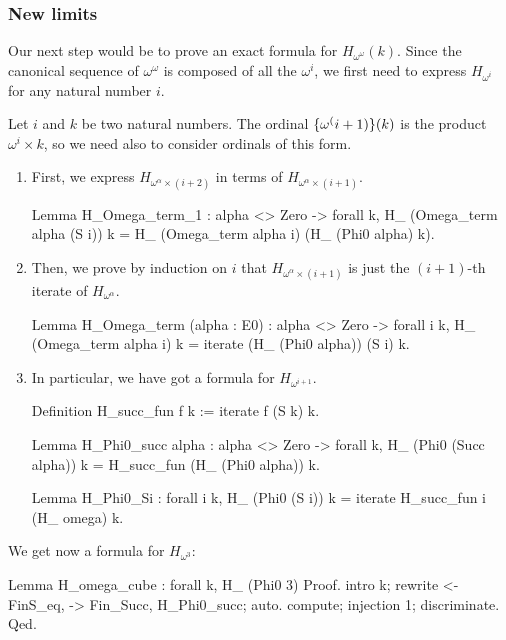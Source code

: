 \documentclass[a4paper]{book}
\begin{document}
\subsubsection{New limits}

Our next step would be to prove an exact formula for $H_{\omega^\omega}(k)$.
Since the canonical sequence of $\omega^\omega$ is composed of all the
$\omega^i$, we first need to express $H_{\omega^i}$ for any natural number $i$.

Let $i$ and $k$ be two natural numbers. 
The ordinal $\mbox{$\{\omega^(i+1)\}(k)$}$ is the product
$\omega^i \times k$, so we need also to consider ordinals of this form.

\begin{enumerate}
\item First,  we express $H_{\omega^\alpha \times (i+2)}$ in terms of
$H_{\omega^\alpha \times (i+1)}$.

\begin{Coqsrc}
Lemma H_Omega_term_1 : alpha <> Zero -> forall  k,  
    H_ (Omega_term alpha (S i)) k =
    H_ (Omega_term alpha i) (H_ (Phi0 alpha) k).
\end{Coqsrc}

\item
Then, we prove by induction on $i$ that $H_{\omega^\alpha \times (i+1)}$ is just the
$(i+1)$-th iterate of $H_{\omega^\alpha}$.


\begin{Coqsrc}
Lemma H_Omega_term (alpha : E0)  :
alpha <> Zero -> forall i k, 
  H_ (Omega_term alpha i) k = iterate  (H_ (Phi0 alpha)) (S i) k.
\end{Coqsrc}

\item In particular, we have got a formula for $H_{\omega^{i+1}}$.

\begin{Coqsrc}
Definition H_succ_fun f k := iterate f (S k) k.

Lemma H_Phi0_succ alpha  : alpha <> Zero -> forall k,
      H_ (Phi0 (Succ alpha)) k = H_succ_fun (H_ (Phi0 alpha)) k. 

Lemma H_Phi0_Si : forall i k,
      H_ (Phi0 (S i)) k = iterate H_succ_fun i (H_ omega) k. 
\end{Coqsrc}

\end{enumerate}
We get now a  formula for $H_{\omega^3}$:

\begin{Coqsrc}
Lemma H_omega_cube : forall k,
    H_ (Phi0 3)%
Proof.
  intro k; rewrite <-FinS_eq, -> Fin_Succ, H_Phi0_succ; auto.
  compute; injection 1; discriminate.
Qed.
\end{Coqsrc}
\end{document}

